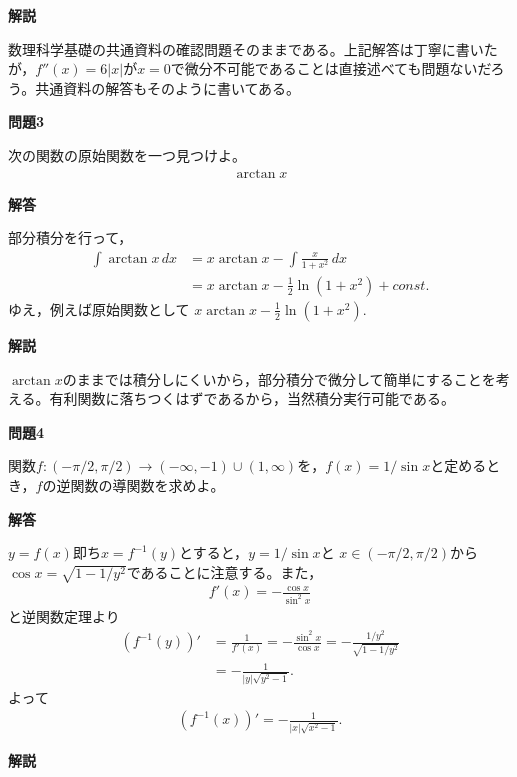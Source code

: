 \documentclass[a4paper,12pt,dvipdfmx,fleqn, oneside]{jsarticle}
\theoremstyle{defstyle}
\theoremstyle{thmx}
\theoremstyle{qesstyle}
\begin{document}
\textbf{解説}

数理科学基礎の共通資料の確認問題そのままである。上記解答は丁寧に書いたが，$f''(x)=6|x|$が$x=0$で微分不可能であることは直接述べても問題ないだろう。共通資料の解答もそのように書いてある。

\begin{shadebox}
    \textbf{問題3}

    次の関数の原始関数を一つ見つけよ。
    \begin{align*}
        \arctan x
    \end{align*}
\end{shadebox}

\begin{screen}
    \textbf{解答}

    \text{　}部分積分を行って，
    \begin{align*}
        \int \arctan x \, dx & = x \arctan x - \int \frac{x}{1+x^2} \, dx        \\
                             & = x \arctan x - \frac{1}{2} \ln (1+ x^2) + const.
    \end{align*}
    ゆえ，例えば原始関数として $x \arctan x - \frac{1}{2} \ln (1+ x^2).  $
\end{screen}

\textbf{解説}

$\arctan x$のままでは積分しにくいから，部分積分で微分して簡単にすることを考える。有利関数に落ちつくはずであるから，当然積分実行可能である。

\begin{shadebox}
    \textbf{問題4}

    関数$f:(-\pi/ 2, \pi / 2) \rightarrow (- \infty , -1) \cup (1, \infty)$を，$f(x)=1/\sin x$と定めるとき，$f$の逆関数の導関数を求めよ。
\end{shadebox}

\begin{screen}
    \textbf{解答}

    \text{　}$y=f(x)$即ち$x=f^{-1}(y)$とすると，$y=1/\sin x $と $x \in (-\pi /2 , \pi /2)$から$\cos x = \sqrt{1-1/y^2}$であることに注意する。また，
    \begin{align*}
        f'(x)=- \frac{\cos x}{\sin^2 x}
    \end{align*}
    と逆関数定理より
    \begin{align*}
        (f^{-1}(y))' & = \frac{1}{f'(x)}
        = - \frac{\sin ^2 x}{\cos x}              = - \frac{1/y^2}{\sqrt{1-1/y^2}} \\
                     & = - \frac{1}{|y|\sqrt{y^2-1}}.
    \end{align*}
    よって
    \begin{align*}
        (f^{-1}(x))' = - \frac{1}{|x|\sqrt{x^2-1}}.
    \end{align*}
\end{screen}
\newpage
\textbf{解説}
\end{document}
